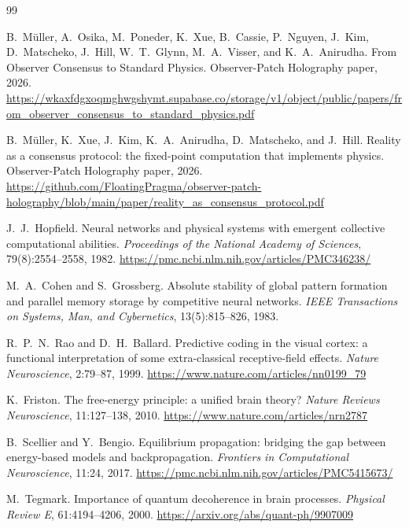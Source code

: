 \documentclass[11pt]{article}
\theoremstyle{remark}
\theoremstyle{plain}
\begin{document}
\begin{thebibliography}{99}

B.\ M\"uller, A.\ Osika, M.\ Poneder, K.\ Xue, B.\ Cassie, P.\ Nguyen, J.\ Kim, D.\ Matscheko, J.\ Hill, W.\ T.\ Glynn, M.\ A.\ Visser, and K.\ A.\ Anirudha.
\newblock From Observer Consensus to Standard Physics.
\newblock Observer-Patch Holography paper, 2026.
\newblock \url{https://wkaxfdgxoqmghwgshymt.supabase.co/storage/v1/object/public/papers/from_observer_consensus_to_standard_physics.pdf}

B.\ M\"uller, K.\ Xue, J.\ Kim, K.\ A.\ Anirudha, D.\ Matscheko, and J.\ Hill.
\newblock Reality as a consensus protocol: the fixed-point computation that implements physics.
\newblock Observer-Patch Holography paper, 2026.
\newblock \url{https://github.com/FloatingPragma/observer-patch-holography/blob/main/paper/reality_as_consensus_protocol.pdf}

J.\ J.\ Hopfield.
\newblock Neural networks and physical systems with emergent collective computational abilities.
\newblock \emph{Proceedings of the National Academy of Sciences}, 79(8):2554--2558, 1982.
\newblock \url{https://pmc.ncbi.nlm.nih.gov/articles/PMC346238/}

M.\ A.\ Cohen and S.\ Grossberg.
\newblock Absolute stability of global pattern formation and parallel memory storage by competitive neural networks.
\newblock \emph{IEEE Transactions on Systems, Man, and Cybernetics}, 13(5):815--826, 1983.

R.\ P.\ N.\ Rao and D.\ H.\ Ballard.
\newblock Predictive coding in the visual cortex: a functional interpretation of some extra-classical receptive-field effects.
\newblock \emph{Nature Neuroscience}, 2:79--87, 1999.
\newblock \url{https://www.nature.com/articles/nn0199_79}

K.\ Friston.
\newblock The free-energy principle: a unified brain theory?
\newblock \emph{Nature Reviews Neuroscience}, 11:127--138, 2010.
\newblock \url{https://www.nature.com/articles/nrn2787}

B.\ Scellier and Y.\ Bengio.
\newblock Equilibrium propagation: bridging the gap between energy-based models and backpropagation.
\newblock \emph{Frontiers in Computational Neuroscience}, 11:24, 2017.
\newblock \url{https://pmc.ncbi.nlm.nih.gov/articles/PMC5415673/}

M.\ Tegmark.
\newblock Importance of quantum decoherence in brain processes.
\newblock \emph{Physical Review E}, 61:4194--4206, 2000.
\newblock \url{https://arxiv.org/abs/quant-ph/9907009}


\end{thebibliography}
\end{document}
